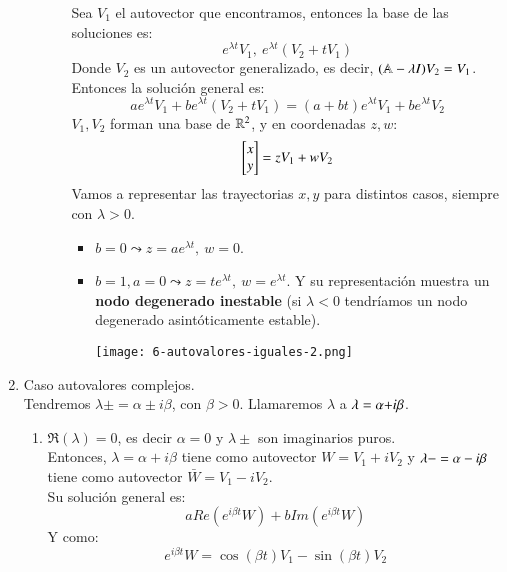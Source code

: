 \begin{enumerate}
\begin{enumerate}
\begin{enumerate}
            Sea $V_1$ el autovector que encontramos, entonces la base de las soluciones es:
            $$
                e^{\lambda t} V_1,\ e^{\lambda t}(V_2 + t V_1)
            $$
            Donde $V_2$ es un autovector generalizado, es decir, $(\mathbb{A} - \lambda I)V_2 = V_1$.
            Entonces la solución general es:
            $$
                ae^{\lambda t} V_1 + b  e^{\lambda t}(V_2 + t V_1) = (a+bt)e^{\lambda t}V_1 + be^{\lambda t}V_2
            $$
            $V_1, V_2$ forman una base de $\mathbb{R}^2$, y en coordenadas $z, w$:
            $$
                \mx{x \\ y } = z V_1 + w V_2
            $$
            Vamos a representar las trayectorias $x, y$ para distintos casos, siempre con $\lambda > 0$.\\
            \begin{itemize}
                \item $b = 0 \leadsto z = ae^{\lambda t},\ w = 0$.
                \item $ b = 1, a = 0 \leadsto z = te^{\lambda t},\ w = e^{\lambda t}$. Y su representación muestra un \textbf{nodo degenerado inestable} (si $\lambda < 0$ tendríamos un nodo degenerado asintóticamente estable).
                \begin{center}
                    \texttt{[image: 6-autovalores-iguales-2.png]}
                \end{center}
            \end{itemize}
        \end{enumerate}
    \end{enumerate}
    \item Caso autovalores complejos.\\
    Tendremos $\lambda \pm = \alpha \pm i \beta$, con $\beta > 0$. Llamaremos $\lambda$ a $\lambda = \alpha \mathbf{+} i\beta$.
    \begin{enumerate}
        \item $\Re(\lambda) = 0$, es decir $\alpha = 0$ y $\lambda \pm$ son imaginarios puros.\\
        Entonces, $\lambda = \alpha + i\beta$ tiene como autovector $W = V_1 + iV_2$ y $\lambda\mathbf{-} = \alpha - i\beta$ tiene como autovector $\bar{W} = V_1 - i V_2$.\\
        Su solución general es:
        $$
            a Re(e^{i\beta t} W) + b Im(e^{i \beta t} W)
        $$
        Y como:
        $$
            e^{i\beta t} W = \cos(\beta t) V_1 - \sin(\beta t)V_2
$$
\end{enumerate}
\end{enumerate}
